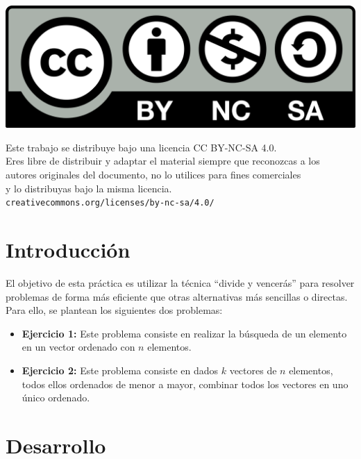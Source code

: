 \documentclass[10pt,a4paper]{article}
\begin{document}
\parbox[t]{\textwidth}{
  \includegraphics[scale=0.05]{by-nc-sa.png}\\[4pt]
  \raggedright %
  \sffamily\large
  {\Large Este trabajo se distribuye bajo una licencia CC BY-NC-SA 4.0.}\\[4pt]
  Eres libre de distribuir y adaptar el material siempre que reconozcas a los\\
  autores originales del documento, no lo utilices para fines comerciales\\
  y lo distribuyas bajo la misma licencia.\\[4pt]
  \texttt{creativecommons.org/licenses/by-nc-sa/4.0/}
}

\newpage

\tableofcontents

\newpage
\section{Introducción}

El objetivo de esta práctica es utilizar la técnica ``divide y vencerás'' para resolver problemas de forma más eficiente que otras alternativas más sencillas o directas. Para ello, se plantean los siguientes dos problemas:

\begin{itemize}
	\item \textbf{Ejercicio 1:} Este problema consiste en realizar la búsqueda de un elemento en un vector ordenado con \(n\) elementos.
	\item \textbf{Ejercicio 2:} Este problema consiste en dados \(k\) vectores de \(n\) elementos, todos ellos ordenados de menor a mayor, combinar todos los vectores en uno único ordenado.
\end{itemize}

\section{Desarrollo}
\end{document}
